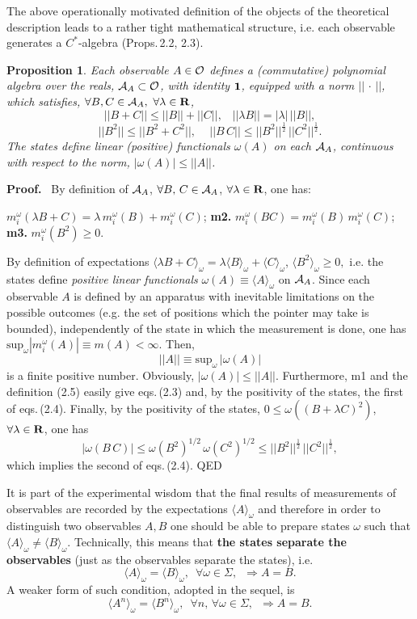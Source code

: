 \documentclass[12pt]{article}
\newtheorem{Proposition}[Theorem]{Proposition}
\def \lan   {\langle}
\def \ran   {\rangle}
\def \Pf {{\bf Proof.\,\,}}
\def \be {\begin{equation}}
\def \ee {\end{equation}}
\def \ume {{\scriptstyle{\frac{1}{2}}}}
\def \eqq {\equiv}
\def \l {{\lambda}}
\def \om {{\omega}}
\def \A {{\cal A}}
\def \O {{\cal O}}
\def \Rbf {{\bf R}}
\begin{document}
  The above operationally motivated definition of the objects of the theoretical description leads  to a rather tight mathematical structure, i.e. each observable generates a $C^*$-algebra (Props.\,2.2, 2.3). 


\begin{Proposition} Each observable $A \in \O$ defines a (commutative) polynomial algebra over the reals, $\A_A \subset \O$,   with identity ${\bf 1}$,  equipped with a norm $||\, \cdot \,||$, which satisfies, $\forall  B, C  \in \A_A, \,\,\forall \l \in \Rbf$,  \be{ || B + C || \leq || B ||  + || C ||, \,\,\,\,\,|| \l B || = |\l|\,|| B ||,}\ee \be { || B^2 || \leq ||B^2 + C^2 ||,\,\,\,\,\,\,\,|| B \, C  || \leq || B^2 ||^\ume\, || C^2 ||^\ume.}\ee 
The states define linear (positive) functionals $\om(A)$ on each $\A_A$, continuous with respect to the norm, $| \om(A) | \leq || A ||$. 
\end{Proposition}
\Pf\, By definition of $\A_A$,    $ \forall B,\, C \in \A_A$, $\forall 
\lambda  \in \Rbf$, one has:  

 $m^\om_i(\l  B + C  ) = \l \,m^\om_i (B) + m^\om_i (C)$; 
{\bf m2.}  $m^\om_i ( B C ) = m^\om_i (B) \,m^\om_i (C)$;
{\bf m3.}  $m^\om_i (B^2) \geq 0$.

\noindent By definition of expectations  $\lan \lambda B  + C \ran_\om = \lambda \lan B \ran_\om + \lan C \ran_\om$, $\lan B^2 \ran_\om \geq 0,$ i.e. the states define {\em positive linear functionals} $\om(A) \eqq \lan A \ran_\om$ on $\A_A$. Since each observable $A$ is defined by an apparatus with inevitable limitations on the possible outcomes (e.g. the set of positions which the pointer may  take is bounded), independently of the state in which the measurement is done,  one has $ \mbox{sup}_\om |m^\om_i(A)| \eqq m(A) < \infty$.  Then,   \be{ || A || \eqq \mbox{sup}_\om \,|\om(A)| }\ee is a finite positive  number. Obviously, $|\om(A)| \leq || A ||$. 
Furthermore, m1 and the definition (2.5) easily give eqs.\,(2.3) and, by the positivity of the states, the first of eqs.\,(2.4).  
Finally, by the positivity of the states,   $ 0 \leq \om((B + \l C)^2)$, $\forall \l \in \Rbf$, one has $$|\om(B \,C)| \leq  \om(B^2)^{1/2}\, \om(C^2)^{1/2} \leq || B^2 ||^{\ume}\, || C^2 ||^{\ume}, $$ which implies the second of eqs.\,(2.4).   
QED

\vspace{2mm}
It is part of the experimental wisdom that the final results of measurements of observables are recorded by the expectations $\lan A \ran_\omega$ and therefore in order to distinguish two observables $A, B$ one should be able to prepare states $\omega$ such that $\lan A \ran_\omega \neq \lan B \ran_\omega$. Technically,  this means that {\bf the states separate the observables} (just as the observables separate the states), i.e. $$ 
 \lan A \ran_\om = \lan B \ran_\om, \,\,\,\forall \om \in \Sigma, \,\,\, \Rightarrow A = B.$$ 
A weaker form  of such condition, adopted in the sequel, is \be{ 
 \lan A^n \ran_\om = \lan B^n \ran_\om, \,\,\,\forall n, \,\forall \om \in \Sigma, \,\,\, \Rightarrow A = B.}\ee 
\end{document}
